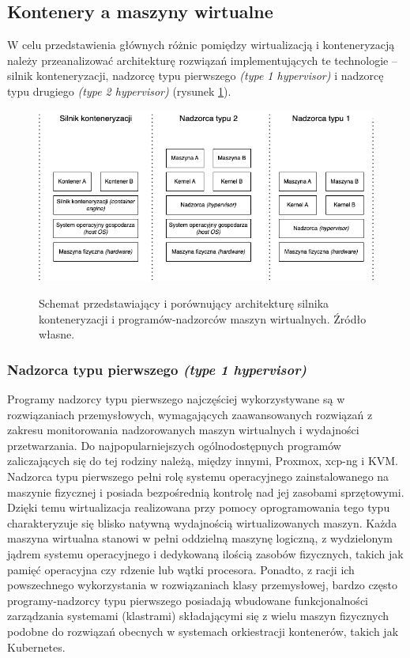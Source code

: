 \subsection{Kontenery a maszyny wirtualne}
W celu przedstawienia głównych różnic pomiędzy wirtualizacją i konteneryzacją należy przeanalizować architekturę rozwiązań implementujących te technologie -- silnik konteneryzacji, nadzorcę typu pierwszego \textit{(type 1 hypervisor)} i nadzorcę typu drugiego \textit{(type 2 hypervisor)} (rysunek \ref{diagramWirtualizacja}).

\begin{figure}[!h]
	\begin{center}
		\resizebox{0.7\textwidth}{!} {
			\includegraphics{img/4/wirtualizacja.png}
		}
		\caption[Porównanie silnika konteneryzacji i programów-nadzorców]{Schemat przedstawiający i porównujący architekturę silnika konteneryzacji i programów-nadzorców maszyn wirtualnych. Źródło własne.}
		\label{diagramWirtualizacja}
	\end{center}
\end{figure}

\subsubsection{Nadzorca typu pierwszego \textit{(type 1 hypervisor)}}
Programy nadzorcy typu pierwszego najczęściej wykorzystywane są w rozwiązaniach przemysłowych, wymagających zaawansowanych rozwiązań z zakresu monitorowania nadzorowanych maszyn wirtualnych i wydajności przetwarzania. Do najpopularniejszych ogólnodostępnych programów zaliczających się do tej rodziny należą, między innymi, Proxmox, xcp-ng i KVM. Nadzorca typu pierwszego pełni rolę systemu operacyjnego zainstalowanego na maszynie fizycznej i posiada bezpośrednią kontrolę nad jej zasobami sprzętowymi. Dzięki temu wirtualizacja realizowana przy pomocy oprogramowania tego typu charakteryzuje się blisko natywną wydajnością wirtualizowanych maszyn. Każda maszyna wirtualna stanowi w pełni oddzielną maszynę logiczną, z wydzielonym jądrem systemu operacyjnego i dedykowaną ilością zasobów fizycznych, takich jak pamięć operacyjna czy rdzenie lub wątki procesora. Ponadto, z racji ich powszechnego wykorzystania w rozwiązaniach klasy przemysłowej, bardzo często programy-nadzorcy typu pierwszego posiadają wbudowane funkcjonalności zarządzania systemami (klastrami) składającymi się z wielu maszyn fizycznych podobne do rozwiązań obecnych w systemach orkiestracji kontenerów, takich jak Kubernetes.

